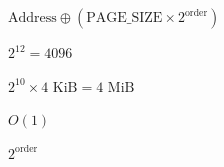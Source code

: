 \documentclass{article}
\begin{document}
$\text{Address} \oplus (\text{PAGE\_SIZE} \times 2^{\text{order}})$
\pagebreak

$2^{12} = 4096$
\pagebreak

$2^{10} \times 4\text{ KiB} = 4\text{ MiB}$
\pagebreak

$O(1)$
\pagebreak

$2^{\text{order}}$
\pagebreak
\end{document}
